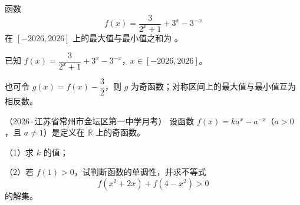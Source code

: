 
\begin{frame}[label=C11q]
  函数
  \[
    f(x)=\frac{3}{2^x+1}+3^x-3^{-x}
  \]
  在 $[-2026,2026]$ 上的最大值与最小值之和为
  \underline{\hspace{2cm}}。
  \pause
\end{frame}

\begin{frame}[label=C11a]
  已知 $f(x)=\dfrac{3}{2^x+1}+3^x-3^{-x}$，$x\in[-2026,2026]$。
  \pause
  \par\vspace{0.15cm}
  也可令 $g(x)=f(x)-\dfrac32$，则 $g$ 为奇函数；对称区间上的最大值与最小值互为相反数。
\end{frame}

\begin{frame}[label=C20q]
  （2026\,$\cdot$\,江苏省常州市金坛区第一中学月考）
  设函数 $f(x)=ka^x-a^{-x}$（$a>0$，且 $a\ne1$）是定义在 $\mathbb R$ 上的奇函数。
  \par\vspace{0.2cm}
  （1）求 $k$ 的值；
  \par
  （2）若 $f(1)>0$，试判断函数的单调性，并求不等式
  \[
    f(x^2+2x)+f(4-x^2)>0
  \]
  的解集。
  \pause
\end{frame}

